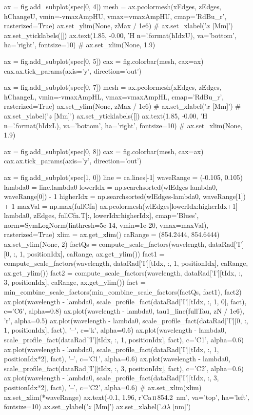 \begin{pycode}[2DRT]
    ax = fig.add_subplot(spec[0, 4])
    mesh = ax.pcolormesh(xEdges, zEdges, hChangeU, vmin=-vmaxAmpHU, vmax=vmaxAmpHU,
                         cmap='RdBu_r', rasterized=True)
    ax.set_ylim(None, zMax / 1e6)
    # ax.set_xlabel('$x$ [Mm]')
    ax.set_yticklabels([])
    ax.text(1.85, -0.00, 'H n={}'.format(hIdxU), va='bottom', ha='right', fontsize=10)
    # ax.set_xlim(None, 1.9)

    ax = fig.add_subplot(spec[0, 5])
    cax = fig.colorbar(mesh, cax=ax)
    cax.ax.tick_params(axis='y', direction='out')

    ax = fig.add_subplot(spec[0, 7])
    mesh = ax.pcolormesh(xEdges, zEdges, hChangeL, vmin=-vmaxAmpHL, vmax=vmaxAmpHL,
                         cmap='RdBu_r', rasterized=True)
    ax.set_ylim(None, zMax / 1e6)
    # ax.set_xlabel('$x$ [Mm]')
    # ax.set_ylabel('$z$ [Mm]')
    ax.set_yticklabels([])
    ax.text(1.85, -0.00, 'H n={}'.format(hIdxL), va='bottom', ha='right', fontsize=10)
    # ax.set_xlim(None, 1.9)

    ax = fig.add_subplot(spec[0, 8])
    cax = fig.colorbar(mesh, cax=ax)
    cax.ax.tick_params(axis='y', direction='out')

    ax = fig.add_subplot(spec[1, 0])
    line = ca.lines[-1]
    waveRange = (-0.105, 0.105)
    lambda0 = line.lambda0
    lowerIdx = np.searchsorted(wlEdges-lambda0, waveRange[0]) - 1
    higherIdx = np.searchsorted(wlEdges-lambda0, waveRange[1]) + 1
    maxVal = np.max(fullCfn)
    ax.pcolormesh(wlEdges[lowerIdx:higherIdx+1]-lambda0, zEdges, fullCfn.T[:, lowerIdx:higherIdx],
                  cmap='Blues', norm=SymLogNorm(linthresh=5e-14, vmin=1e-20, vmax=maxVal), rasterized=True)
    xlim = ax.get_xlim()
    caRange = (854.2444, 854.6444)
    ax.set_ylim(None, 2)
    factQs = compute_scale_factors(wavelength, dataRad['I'][0, :, 1, positionIdx], caRange, ax.get_ylim())
    fact1 = compute_scale_factors(wavelength, dataRad['I'][tIdx, :, 1, positionIdx], caRange, ax.get_ylim())
    fact2 = compute_scale_factors(wavelength, dataRad['I'][tIdx, :, 3, positionIdx], caRange, ax.get_ylim())
    fact = min_combine_scale_factors(min_combine_scale_factors(factQs, fact1), fact2)
    ax.plot(wavelength - lambda0,
            scale_profile_fact(dataRad['I'][tIdx, :, 1, 0], fact),  c='C6', alpha=0.8)
    ax.plot(wavelength - lambda0, tau1_line(fullTau, zN / 1e6), 'r', alpha=0.5)
    ax.plot(wavelength - lambda0,
            scale_profile_fact(dataRad['I'][0, :, 1, positionIdx], fact), '--', c='k', alpha=0.6)
    ax.plot(wavelength - lambda0,
            scale_profile_fact(dataRad['I'][tIdx, :, 1, positionIdx], fact), c='C1', alpha=0.6)
    ax.plot(wavelength - lambda0,
            scale_profile_fact(dataRad['I'][tIdx, :, 1, positionIdx*2], fact), '--', c='C1', alpha=0.6)
    ax.plot(wavelength - lambda0,
            scale_profile_fact(dataRad['I'][tIdx, :, 3, positionIdx], fact), c='C2', alpha=0.6)
    ax.plot(wavelength - lambda0,
            scale_profile_fact(dataRad['I'][tIdx, :, 3, positionIdx*2], fact), '--', c='C2', alpha=0.6)
    # ax.set_xlim(xlim)
    ax.set_xlim(*waveRange)
    ax.text(-0.1, 1.96, r'Ca\,\textsc{ii}\,\SI{854.2}{\nano\metre}', va='top', ha='left', fontsize=10)
    ax.set_ylabel('$z$ [Mm]')
    ax.set_xlabel('$\Delta\lambda$ [nm]')


\end{pycode}
